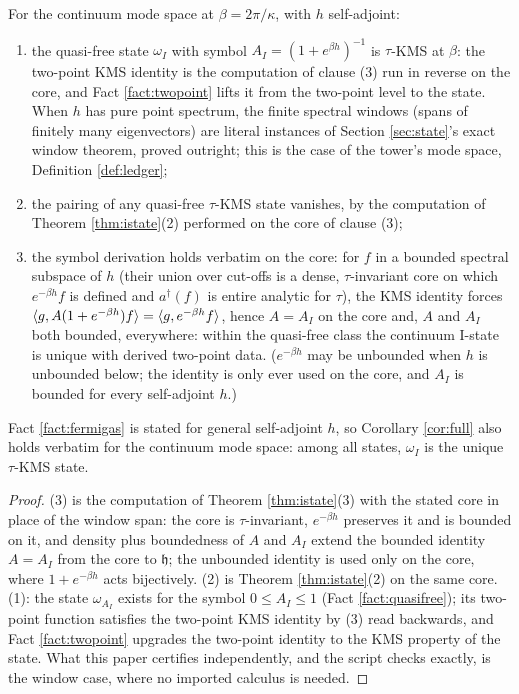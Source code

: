 \begin{theorem}\label{thm:continuum}
For the continuum mode space at $\beta = 2\pi/\kappa$, with $h$ self-adjoint:
\begin{enumerate}
\item the quasi-free state $\omega_I$ with symbol $A_I = (1 + e^{\beta h})^{-1}$ is $\tau$-KMS at $\beta$: the two-point KMS identity is the computation of clause (3) run in reverse on the core, and Fact \ref{fact:twopoint} lifts it from the two-point level to the state. When $h$ has pure point spectrum, the finite spectral windows (spans of finitely many eigenvectors) are literal instances of Section \ref{sec:state}'s exact window theorem, proved outright; this is the case of the tower's mode space, Definition \ref{def:ledger};
\item the pairing of any quasi-free $\tau$-KMS state vanishes, by the computation of Theorem \ref{thm:istate}(2) performed on the core of clause (3);
\item the symbol derivation holds verbatim on the core: for $f$ in a bounded spectral subspace of $h$ (their union over cut-offs is a dense, $\tau$-invariant core on which $e^{-\beta h}f$ is defined and $a^\dagger(f)$ is entire analytic for $\tau$), the KMS identity forces $\langle g, A(1 + e^{-\beta h})f\rangle = \langle g, e^{-\beta h}f\rangle$, hence $A = A_I$ on the core and, $A$ and $A_I$ both bounded, everywhere: within the quasi-free class the continuum I-state is unique with derived two-point data. ($e^{-\beta h}$ may be unbounded when $h$ is unbounded below; the identity is only ever used on the core, and $A_I$ is bounded for every self-adjoint $h$.)
\end{enumerate}
Fact \ref{fact:fermigas} is stated for general self-adjoint $h$, so Corollary \ref{cor:full} also holds verbatim for the continuum mode space: among all states, $\omega_I$ is the unique $\tau$-KMS state.
\end{theorem}

\begin{proof}
(3) is the computation of Theorem \ref{thm:istate}(3) with the stated core in place of the window span: the core is $\tau$-invariant, $e^{-\beta h}$ preserves it and is bounded on it, and density plus boundedness of $A$ and $A_I$ extend the bounded identity $A = A_I$ from the core to $\mathfrak{h}$; the unbounded identity is used only on the core, where $1 + e^{-\beta h}$ acts bijectively. (2) is Theorem \ref{thm:istate}(2) on the same core. (1): the state $\omega_{A_I}$ exists for the symbol $0 \le A_I \le 1$ (Fact \ref{fact:quasifree}); its two-point function satisfies the two-point KMS identity by (3) read backwards, and Fact \ref{fact:twopoint} upgrades the two-point identity to the KMS property of the state. What this paper certifies independently, and the script checks exactly, is the window case, where no imported calculus is needed.
\end{proof}


